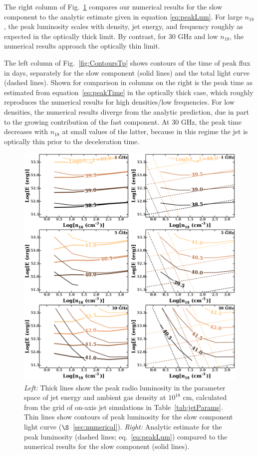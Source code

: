 \documentclass[usenatbib,fleqn]{mnras}
\begin{document}
The right column of Fig.~\ref{fig:jetContours} compares our numerical
results for the slow component to the analytic estimate given in
equation \eqref{eq:peakLum}.  For large $n_{18}$, the peak luminosity
scales with density, jet energy, and frequency roughly as expected in
the optically thick limit.  By contrast, for 30 GHz and low $n_{18}$,
the numerical results approach the optically thin limit.

The left column of Fig.~\ref{fig:ContoursTp} shows contours of the
time of peak flux in days, separately for the slow component (solid
lines) and the total light curve (dashed lines).  Shown for comparison
in columns on the right is the peak time as estimated from
equation~\eqref{eq:peakTime} in the optically thick case, which
roughly reproduces the numerical results for high densities/low
frequencies. For low densities, the numerical results diverge from the
analytic prediction, due in part to the growing contribution of the
fast component.  At 30 GHz, the peak time decreases with $n_{18}$ at
small values of the latter, because in this regime the jet is
optically thin prior to the deceleration time.




\begin{figure}
  \includegraphics[width=16cm]{lp_contours_new.pdf}
  \caption{\label{fig:jetContours} {\it {Left:}} Thick lines show the
    peak radio luminosity in the parameter space of jet energy and
    ambient gas density at $10^{18}$ cm, calculated from the grid of
    on-axis jet simulations in Table~\ref{tab:jetParams}. Thin lines
    show contours of peak luminosity for the slow component light
    curve ($\S$~\ref{sec:numerical}). {\it Right:} Analytic estimate
    for the peak luminosity (dashed lines; eq.~\ref{eq:peakLum})
    compared to the numerical results for the slow component (solid
    lines).}
\end{figure}
\end{document}
